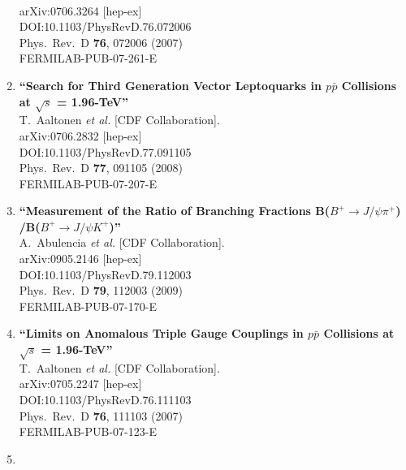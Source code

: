 \documentclass{article}
\begin{document}
\begin{enumerate}
  \\{}arXiv:0706.3264 [hep-ex]
  \\{}DOI:10.1103/PhysRevD.76.072006
  \\{}Phys.\ Rev.\ D {\bf 76}, 072006 (2007)
  \\{}FERMILAB-PUB-07-261-E
\item%
{\bf ``Search for Third Generation Vector Leptoquarks in $p \bar{p}$ Collisions at $\sqrt{s}$ = 1.96-TeV''}
  \\{}T.~Aaltonen {\it et al.} [CDF Collaboration].
  \\{}arXiv:0706.2832 [hep-ex]
  \\{}DOI:10.1103/PhysRevD.77.091105
  \\{}Phys.\ Rev.\ D {\bf 77}, 091105 (2008)
  \\{}FERMILAB-PUB-07-207-E
\item%
{\bf ``Measurement of the Ratio of Branching Fractions B($B^+ \to J/\psi \pi^+$) /B($B^+ \to J/\psi K^+$)''}
  \\{}A.~Abulencia {\it et al.} [CDF Collaboration].
  \\{}arXiv:0905.2146 [hep-ex]
  \\{}DOI:10.1103/PhysRevD.79.112003
  \\{}Phys.\ Rev.\ D {\bf 79}, 112003 (2009)
  \\{}FERMILAB-PUB-07-170-E
\item%
{\bf ``Limits on Anomalous Triple Gauge Couplings in $p \bar{p}$ Collisions at $\sqrt{s}$ = 1.96-TeV''}
  \\{}T.~Aaltonen {\it et al.} [CDF Collaboration].
  \\{}arXiv:0705.2247 [hep-ex]
  \\{}DOI:10.1103/PhysRevD.76.111103
  \\{}Phys.\ Rev.\ D {\bf 76}, 111103 (2007)
  \\{}FERMILAB-PUB-07-123-E
\item%

\end{enumerate}
\end{document}
